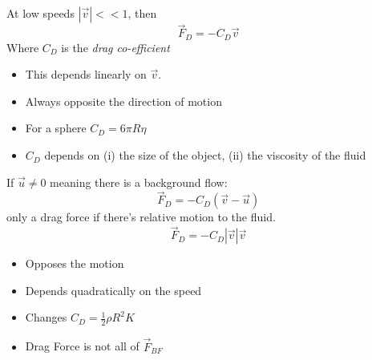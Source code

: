 \documentclass[10pt]{scrartcl}
\begin{document}
At low speeds $|\vec{v}| << 1$, then 
\[\vec{F}_D = -C_D\vec{v}\]
Where $C_D$ is the \emph{drag co-efficient}

\begin{itemize}
\item This depends linearly on $\vec{v}$.
\item Always opposite the direction of motion
\item For a sphere $C_D = 6\pi R\eta$
\item $C_D$ depends on (i) the size of the object, (ii) the viscosity of the fluid
\end{itemize}
If $\vec{u} \neq 0$ meaning there is a background flow:
\[\vec{F}_D = -C_D(\vec{v} - \vec{u})\]
only a drag force if there's relative motion to the fluid.\\

\[\vec{F}_D = -C_D|\vec{v}|\vec{v}\]
\begin{itemize}
\item Opposes the motion
\item Depends quadratically on the speed
\item Changes $C_D = \frac{1}{2}\rho R^2K$
\item Drag Force is not all of $\vec{F}_{BF}$
\begin{center}
	
\end{center}
\end{itemize}
\end{document}

